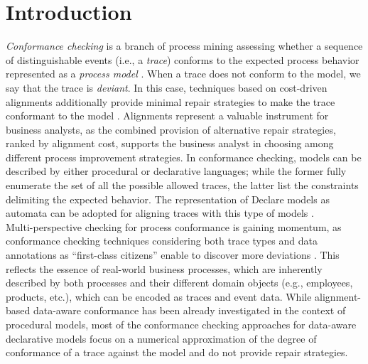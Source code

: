 \section{Introduction}
\label{sec:introduction}

\textit{Conformance checking} is a branch of process mining assessing whether a sequence of distinguishable events (i.e., a \textit{trace}) conforms to the expected process behavior represented as a \textit{process model} \cite{RozinatA08}. When a trace does not conform to the model, we say that the trace is \textit{deviant}. In this case, techniques based on cost-driven alignments additionally provide minimal repair strategies to make the trace conformant to the model \cite{DBLP:conf/edoc/AdriansyahDA11}. Alignments represent a valuable instrument for business analysts, as the combined provision of alternative repair strategies, ranked by alignment cost, supports the business analyst in choosing among different process improvement strategies. In conformance checking, models can be described by either procedural or declarative languages;  while the former fully enumerate the set of all the possible allowed traces, the latter %
list the constraints delimiting the expected behavior. %
%
The representation of Declare models as automata can be adopted for aligning traces with this type of models \cite{LeoniMA12,XuLZ17a}.
\\
\indent
Multi-perspective checking for process conformance is gaining momentum, as conformance checking techniques considering both trace types and data annotations as ``first-class citizens'' enable to discover more deviations \cite{MultiPerspective}. This reflects the essence of real-world business processes, which are inherently described by both processes and their different domain objects \cite{PetermannJMR14} (e.g., employees, products, etc.), which can be encoded as traces and event data. While alignment-based  data-aware conformance has been already investigated in the context of procedural models, most of the conformance checking approaches for data-aware declarative models \cite{BurattinMS16,Borrego014} focus on a numerical approximation of the degree of conformance of a trace against the model and do not provide repair strategies.
